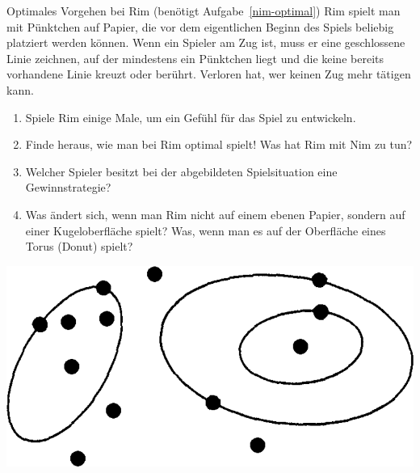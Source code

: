 \documentclass{zirkelblatt}
\begin{document}
\begin{aufgabe}{Optimales Vorgehen bei Rim
(benötigt Aufgabe~\ref{nim-optimal})}
Rim spielt man mit Pünktchen auf Papier, die vor dem eigentlichen Beginn des
Spiels beliebig platziert werden können. Wenn ein Spieler am Zug ist, muss er
eine geschlossene Linie zeichnen, auf der mindestens ein Pünktchen liegt und
die keine bereits vorhandene Linie kreuzt oder berührt. Verloren hat, wer
keinen Zug mehr tätigen kann.

\begin{enumerate}
\item Spiele Rim einige Male, um ein Gefühl für das Spiel zu entwickeln.
\item Finde heraus, wie man bei Rim optimal spielt! Was hat Rim mit Nim zu tun?
\item Welcher Spieler besitzt bei der abgebildeten Spielsituation eine
Gewinnstrategie?
\item Was ändert sich, wenn man Rim nicht auf einem ebenen Papier, sondern auf
einer Kugeloberfläche spielt? Was, wenn man es auf der Oberfläche eines Torus
(Donut) spielt?
\end{enumerate}

\begin{center}
\includegraphics[scale=0.3]{rim}
\end{center}
\end{aufgabe}
\end{document}
